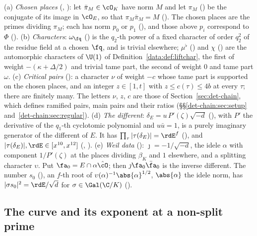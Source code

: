 \begin{definition}\label{der:def:field}
(a) \emph{Chosen places} (, ): let
$\bar\pi_M\in\cO_K$ have norm $M$ and let $\pi_M$ () be the conjugate of its
image in $\cO_E$, so that $\pi_M\bar\pi_M=M$ (). The chosen places are
the primes dividing $\pi_M$; each has norm $p_0$ or $p_1$ (), and
those above $p_i$ correspond to $\Phi$ ().
(b) \emph{Characters}: $\omega_{\fq}$ () is the $q_2$-th power of a fixed
character of order $q_2^2$ of the residue field at a chosen $\fq$, and is trivial elsewhere;
$\mu^\flat$ () and $\chi$ () are the automorphic characters
of $\U(1)$ of Definition~\ref{data:def:liftchar}, the first of weight $-(\kappa+\Delta/2)$ and trivial
tame part, the second of weight $0$ and tame part $\omega$.
(c) \emph{Critical pairs} (): a character $\nu$ of weight $-c$ whose
tame part is supported on the chosen places, and an integer $z\in[1,t]$ with $z\le c(\tau)\le4b$
at every $\tau$; there are finitely many. The letters $\nu$, $z$, $c$ are those of
Section~\ref{sec:det-chain}, which defines ramified pairs, main pairs and their ratios
(\S\S\ref{det-chain:sec:setup} and~\ref{det-chain:sec:regular}).
(d) \emph{The different}: $\delta_E=u\,P'(\zeta)\sqrt{-d}$ (), with
$P'$ the derivative of the $q_1$-th cyclotomic polynomial and $u\bar u=1$, is a purely imaginary
generator of the different of $E$. It has $\prod_\tau|\tau(\delta_E)|=\rdE^f$
(), and $|\tau(\delta_E)|,\rdE\in
[x^{10},x^{12}]$ (, ).
(e) \emph{Weil data} (): $\jmath=-1/\sqrt{-d}$, the idele
$\alpha$ with component $1/P'(\zeta)$ at the places dividing $\beta_K$ and $1$ elsewhere, and a
splitting character $\upsilon$. Put $\fa_0=E\cap\alpha\hat\cO$; then $\jmath\fa_0\bar\fa_0$ is the inverse
different. The number $s_0$ (), an $f$-th root of
$\upsilon(\alpha)^{-1}\abs{\alpha}^{1/2}$, $\abs{\alpha}$ the idele norm, has $|\sigma s_0|^2=\rdE/\sqrt d$ for $\sigma\in\Gal(\C/K)$
().
\end{definition}

\subsection{The curve and its exponent at a non-split prime}\label{der:sec:curve}

